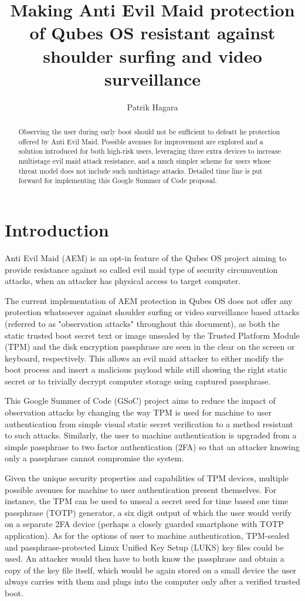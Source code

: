 \documentclass[10pt,a4paper,twocolumn]{article}
\title{Making Anti Evil Maid protection of Qubes OS resistant against shoulder
surfing and video surveillance}
\author{Patrik Hagara}
\begin{document}
\maketitle

\begin{abstract}
  \noindent
  Observing the user during early boot should not be sufficient to defeatt he
  protection offered by Anti Evil Maid. Possible avenues for improvement are
  explored and a solution introduced for both high-risk users, leveraging three
  extra devices to increase multistage evil maid attack resistance, and a much
  simpler scheme for users whose threat model does not include such multistage
  attacks. Detailed time line is put forward for implementing this Google
  Summer of Code proposal.
\end{abstract}


\section{Introduction}

Anti Evil Maid (AEM) is an opt-in feature of the Qubes OS \cite{qubes-homepage}
project aiming to provide resistance against so called evil maid type of
security circumvention attacks, when an attacker has physical access to target
computer.

The current implementation of AEM protection in Qubes OS does not offer any
protection whatsoever against shoulder surfing or video surveillance based
attacks (referred to as "observation attacks" throughout this document), as
both the static trusted boot secret text or image unsealed by the Trusted
Platform Module (TPM) and the disk encryption passphrase are seen in the clear
on the screen or keyboard, respectively. This allows an evil maid attacker to
either modify the boot process and insert a malicious payload while still
showing the right static secret or to trivially decrypt computer storage using
captured passphrase.

This Google Summer of Code (GSoC) project aims to reduce the impact of
observation attacks by changing the way TPM is used for machine to user
authentication from simple visual static secret verification to a method
resistant to such attacks. Similarly, the user to machine authentication is
upgraded from a simple passphrase to two factor authentication (2FA) so that an
attacker knowing only a passphrase cannot compromise the system.

Given the unique security properties and capabilities of TPM devices, multiple
possible avenues for machine to user authentication present themselves. For
instance, the TPM can be used to unseal a secret seed for time based one time
passphrase (TOTP) generator, a six digit output of which the user would verify
on a separate 2FA device (perhaps a closely guarded smartphone with TOTP
application). As for the options of user to machine authentication, TPM-sealed
and passphrase-protected Linux Unified Key Setup (LUKS) key files could be
used. An attacker would then have to both know the passphrase and obtain a copy
of the key file itself, which would be again stored on a small device the user
always carries with them and plugs into the computer only after a verified
trusted boot.
\end{document}
